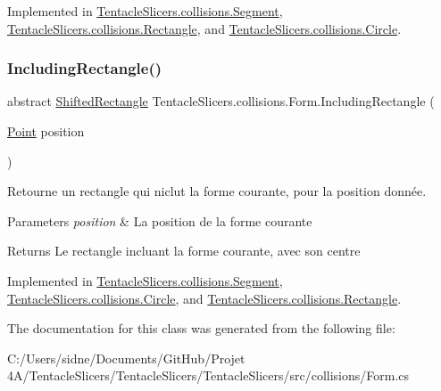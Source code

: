 Implemented in \hyperlink{class_tentacle_slicers_1_1collisions_1_1_segment_a6af6eae47bbfa2f74e0e714e034d5af8}{Tentacle\+Slicers.\+collisions.\+Segment}, \hyperlink{class_tentacle_slicers_1_1collisions_1_1_rectangle_a8d770e1cd3fc4b6315f791f918fa4eaa}{Tentacle\+Slicers.\+collisions.\+Rectangle}, and \hyperlink{class_tentacle_slicers_1_1collisions_1_1_circle_ab10bf9ec3edacdee45d26ea035dae849}{Tentacle\+Slicers.\+collisions.\+Circle}.

\mbox{\label{class_tentacle_slicers_1_1collisions_1_1_form_a00c94b5a1e83d9db6aa3a4cab969fd2c}} 
\subsubsection{\texorpdfstring{Including\+Rectangle()}{IncludingRectangle()}}
{\footnotesize\ttfamily abstract \hyperlink{struct_tentacle_slicers_1_1collisions_1_1_shifted_rectangle}{Shifted\+Rectangle} Tentacle\+Slicers.\+collisions.\+Form.\+Including\+Rectangle (\begin{DoxyParamCaption}\item[{\hyperlink{class_tentacle_slicers_1_1general_1_1_point}{Point}}]{position }\end{DoxyParamCaption})\hspace{0.3cm}{\ttfamily [pure virtual]}}



Retourne un rectangle qui niclut la forme courante, pour la position donnée. 


\begin{DoxyParams}{Parameters}
{\em position} & La position de la forme courante \\
\hline
\end{DoxyParams}
\begin{DoxyReturn}{Returns}
Le rectangle incluant la forme courante, avec son centre 
\end{DoxyReturn}


Implemented in \hyperlink{class_tentacle_slicers_1_1collisions_1_1_segment_a9d4a74136b93980586e412d8bb295ec9}{Tentacle\+Slicers.\+collisions.\+Segment}, \hyperlink{class_tentacle_slicers_1_1collisions_1_1_circle_a6bf295c6a8768b43e53f37a349678d37}{Tentacle\+Slicers.\+collisions.\+Circle}, and \hyperlink{class_tentacle_slicers_1_1collisions_1_1_rectangle_a89ed2b7c68bab5fa949388dc7d16cb0d}{Tentacle\+Slicers.\+collisions.\+Rectangle}.



The documentation for this class was generated from the following file\+:\begin{DoxyCompactItemize}
\item 
C\+:/\+Users/sidne/\+Documents/\+Git\+Hub/\+Projet 4\+A/\+Tentacle\+Slicers/\+Tentacle\+Slicers/\+Tentacle\+Slicers/src/collisions/Form.\+cs\end{DoxyCompactItemize}
